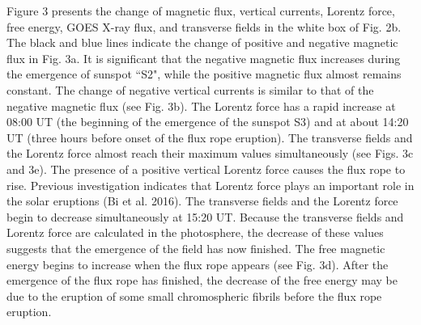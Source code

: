 \documentclass[12pt,preprint]{aastex}
\begin{document}
\begin{CJK*}{UTF8}{gbsn}
Figure 3 presents the change of magnetic flux, vertical currents, Lorentz force, free energy, GOES X-ray flux, and transverse fields in the white box of Fig. 2b. The black and blue lines indicate the change of positive and negative magnetic flux in Fig. 3a.  It is significant that the negative magnetic flux increases during the emergence of sunspot ``S2", while the positive magnetic flux almost remains constant. The change of negative vertical currents is similar to that of the negative magnetic flux (see Fig. 3b).  The Lorentz force has a rapid increase at 08:00 UT (the beginning of the emergence of the sunspot S3) and at about 14:20 UT (three hours before onset of the flux rope eruption). The transverse fields and the Lorentz force almost reach their maximum values simultaneously (see Figs. 3c and 3e). The presence of a positive vertical Lorentz force causes the flux rope to rise. Previous investigation indicates that Lorentz force plays an important role in the solar eruptions (Bi et al. 2016). The transverse fields and the Lorentz force begin to decrease simultaneously at 15:20 UT. Because the transverse fields and Lorentz force are calculated in the photosphere, the decrease of these values suggests that the emergence of the field has now finished. The free magnetic energy begins to  increase when the flux rope appears (see Fig. 3d). After the emergence of the flux rope has finished, the decrease of the free energy may be due to the eruption of some small chromospheric fibrils before the flux rope eruption.



\end{CJK*}
\end{document}
